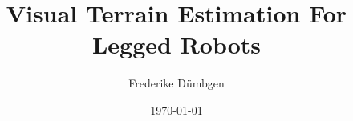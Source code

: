 \documentclass{beamer}
\title{Visual Terrain Estimation For Legged Robots}
\author{Frederike Dümbgen}
\date{\today}
\begin{document}
\frame{\titlepage}






\end{document}
